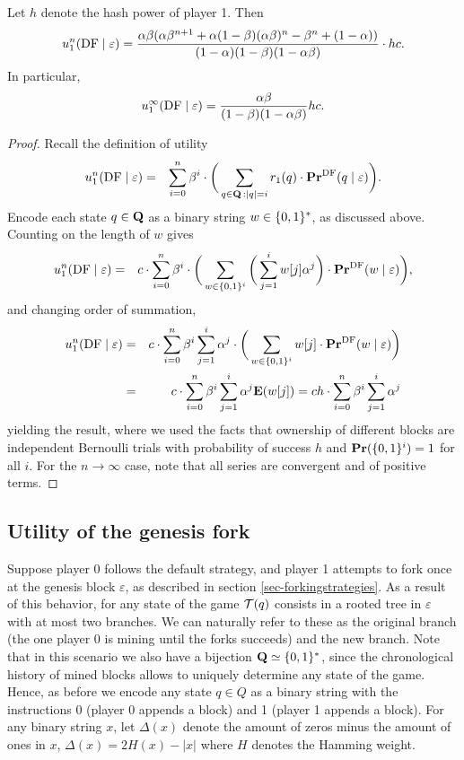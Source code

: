 \begin{myprop}
Let $h$ denote the hash power of player 1. Then 
$$u_1^n(\text{\rm DF}\mid\varepsilon) = \frac{\alpha\beta(\alpha\beta^{n+1}+\alpha(1-\beta)(\alpha\beta)^{n}-\beta^{n}+(1-\alpha))}{(1-\alpha)(1-\beta)(1-\alpha\beta)}\cdot h c.$$
In particular,
$$u_1^\infty(\text{\rm DF}\mid\varepsilon) = \frac{\alpha\beta}{(1-\beta)(1-\alpha\beta)}hc.$$
\end{myprop}
\begin{proof}
Recall the definition of utility 
\begin{eqnarray*}
u_1^n(\text{\rm DF} \mid \varepsilon) & = & \sum_{i=0}^{n}\beta^{i} \cdot  \bigg(\sum_{\substack{q \in \mathbf{Q} \,: |q| = i}} r_1(q) \cdot 
\mathbf{Pr}^{\text{\rm DF}}(q \mid \varepsilon)\bigg).
\end{eqnarray*}
Encode each state $q\in\mathbf{Q}$ as a binary string $w\in \{0,1\}^\ast$, as discussed above. Counting on the length of $w$ gives
\begin{eqnarray*}
u_1^n(\text{\rm DF} \mid \varepsilon)& = & c\cdot \sum_{i=0}^{n}\beta^{i} \cdot\bigg(\sum_{w\in\{0,1\}^i}  \bigg( \sum_{j=1}^{i}w[j] \alpha^j \bigg)\cdot 
\mathbf{Pr}^{\text{\rm DF}}(w \mid \varepsilon)\bigg),
\end{eqnarray*}
and changing order of summation,
\begin{eqnarray*}
u_1^n(\text{\rm DF} \mid \varepsilon)& = &c\cdot \sum_{i=0}^{n}\beta^{i}\sum_{j=1}^{i} \alpha^j \cdot\bigg(\sum_{w\in\{0,1\}^i}   w[j]\cdot 
\mathbf{Pr}^{\text{\rm DF}}(w \mid \varepsilon)\bigg)\\
							& = & c\cdot \sum_{i=0}^{n}\beta^{i}\sum_{j=1}^{i} \alpha^j \mathbf{E}(w[j]) = ch\cdot \sum_{i=0}^{n}\beta^{i}\sum_{j=1}^{i} \alpha^j 
\end{eqnarray*}
yielding the result, where we used the facts that ownership of different blocks are independent Bernoulli trials with probability of success $h$ and $\mathbf{Pr}(\{0,1\}^i)=1$ for all $i$. For the $n\to\infty$ case, note that all series are convergent and of positive terms.
\end{proof}

\subsection{Utility of the genesis fork}
\label{sec-genfork}
Suppose player 0 follows the default strategy, and player 1 attempts to fork once at the genesis block $\varepsilon$, as described in section \ref{sec-forkingstrategies}. As a result of this behavior, for any state of the game $\mathcal{T}(q)$ consists in a rooted tree in $\varepsilon$ with at most two branches. We can naturally refer to these as the original branch (the one player 0 is mining until the forks succeeds) and the new branch. Note that in this scenario we also have a bijection $\mathbf{Q}\simeq \{0,1\}^\ast$, since the chronological history of mined blocks allows to uniquely determine any state of the game. Hence, as before we encode any state $q\in Q$ as a binary string with the instructions 0 (player 0 appends a block) and 1 (player 1 appends a block). For any binary string $x$, let $\Delta(x)$ denote the amount of zeros minus the amount of ones in $x$, \ie $\Delta(x)=2H(x)-|x|$ where $H$ denotes the Hamming weight.

